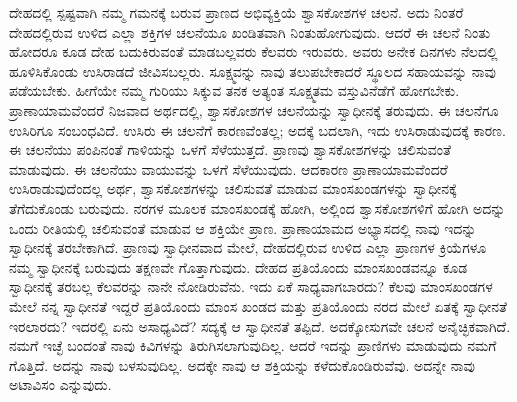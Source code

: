 ದೇಹದಲ್ಲಿ ಸ್ಪಷ್ಟವಾಗಿ ನಮ್ಮ ಗಮನಕ್ಕೆ ಬರುವ ಪ್ರಾಣದ ಅಭಿವ್ಯಕ್ತಿಯೆ ಶ್ವಾಸಕೋಶಗಳ ಚಲನೆ. ಅದು ನಿಂತರೆ ದೇಹದಲ್ಲಿರುವ ಉಳಿದ ಎಲ್ಲಾ ಶಕ್ತಿಗಳ ಚಲನೆಯೂ ಖಂಡಿತವಾಗಿ ನಿಂತುಹೋಗುವುದು. ಆದರೆ ಈ ಚಲನೆ ನಿಂತು ಹೋದರೂ ಕೂಡ ದೇಹ ಬದುಕಿರುವಂತೆ ಮಾಡಬಲ್ಲವರು ಕೆಲವರು ಇರುವರು. ಅವರು ಅನೇಕ ದಿನಗಳು ನೆಲದಲ್ಲಿ ಹೂಳಿಸಿಕೊಂಡು ಉಸಿರಾಡದೆ ಜೀವಿಸಬಲ್ಲರು. ಸೂಕ್ಷ್ಮವನ್ನು ನಾವು ತಲುಪಬೇಕಾದರೆ ಸ್ಥೂಲದ ಸಹಾಯವನ್ನು ನಾವು ಪಡೆಯಬೇಕು. ಹೀಗೆಯೇ ನಮ್ಮ ಗುರಿಯು ಸಿಕ್ಕುವ ತನಕ ಅತ್ಯಂತ ಸೂಕ್ಷ್ಮತಮ ವಸ್ತುವಿನೆಡೆಗೆ ಹೋಗಬೇಕು. ಪ್ರಾಣಾಯಾಮವೆಂದರೆ ನಿಜವಾದ ಅರ್ಥದಲ್ಲಿ, ಶ್ವಾಸಕೋಶಗಳ ಚಲನೆಯನ್ನು ಸ್ವಾಧೀನಕ್ಕೆ ತರುವುದು. ಈ ಚಲನೆಗೂ ಉಸಿರಿಗೂ ಸಂಬಂಧವಿದೆ. ಉಸಿರು ಈ ಚಲನೆಗೆ ಕಾರಣವೆಂತಲ್ಲ; ಅದಕ್ಕೆ ಬದಲಾಗಿ, ಇದು ಉಸಿರಾಡುವುದಕ್ಕೆ ಕಾರಣ. ಈ ಚಲನೆಯು ಪಂಪಿನಂತೆ ಗಾಳಿಯನ್ನು ಒಳಗೆ ಸೆಳೆಯುತ್ತದೆ. ಪ್ರಾಣವು ಶ್ವಾಸಕೋಶಗಳನ್ನು ಚಲಿಸುವಂತೆ ಮಾಡುವುದು. ಈ ಚಲನೆಯು ವಾಯುವನ್ನು ಒಳಗೆ ಸೆಳೆಯುವುದು. ಆದಕಾರಣ ಪ್ರಾಣಾಯಾಮವೆಂದರೆ ಉಸಿರಾಡುವುದೆಂದಲ್ಲ ಅರ್ಥ, ಶ್ವಾಸಕೋಶಗಳನ್ನು ಚಲಿಸುವತೆ ಮಾಡುವ ಮಾಂಸಖಂಡಗಳನ್ನು ಸ್ವಾಧೀನಕ್ಕೆ ತೆಗೆದುಕೊಂಡು ಬರುವುದು. ನರಗಳ ಮೂಲಕ ಮಾಂಸಖಂಡಕ್ಕೆ ಹೋಗಿ, ಅಲ್ಲಿಂದ ಶ್ವಾಸಕೋಶಗಳಿಗೆ ಹೋಗಿ ಅದನ್ನು ಒಂದು ರೀತಿಯಲ್ಲಿ ಚಲಿಸುವಂತೆ ಮಾಡುವ ಆ ಶಕ್ತಿಯೇ ಪ್ರಾಣ. ಪ್ರಾಣಾಯಾಮದ ಅಭ್ಯಾಸದಲ್ಲಿ ನಾವು ಇದನ್ನು ಸ್ವಾಧೀನಕ್ಕೆ ತರಬೇಕಾಗಿದೆ. ಪ್ರಾಣವು ಸ್ವಾಧೀನವಾದ ಮೇಲೆ, ದೇಹದಲ್ಲಿರುವ ಉಳಿದ ಎಲ್ಲಾ ಪ್ರಾಣಗಳ ಕ್ರಿಯೆಗಳೂ ನಮ್ಮ ಸ್ವಾಧೀನಕ್ಕೆ ಬರುವುದು ತಕ್ಷಣವೇ ಗೊತ್ತಾಗುವುದು. ದೇಹದ ಪ್ರತಿಯೊಂದು ಮಾಂಸಖಂಡವನ್ನೂ ಕೂಡ ಸ್ವಾಧೀನಕ್ಕೆ ತರಬಲ್ಲ ಕೆಲವರನ್ನು ನಾನೇ ನೋಡಿರುವೆನು. ಇದು ಏಕೆ ಸಾಧ್ಯವಾಗಬಾರದು? ಕೆಲವು ಮಾಂಸಖಂಡಗಳ ಮೇಲೆ ನನ್ನ ಸ್ವಾಧೀನತೆ ಇದ್ದರೆ ಪ್ರತಿಯೊಂದು ಮಾಂಸ ಖಂಡದ ಮತ್ತು ಪ್ರತಿಯೊಂದು ನರದ ಮೇಲೆ ಏತಕ್ಕೆ ಸ್ವಾಧೀನತೆ ಇರಲಾರದು? ಇದರಲ್ಲಿ ಏನು ಅಸಾಧ್ಯವಿದೆ? ಸದ್ಯಕ್ಕೆ ಆ ಸ್ವಾಧೀನತೆ ತಪ್ಪಿದೆ. ಅದಕ್ಕೋಸುಗವೇ ಚಲನೆ ಅನೈಚ್ಛಿಕವಾಗಿದೆ. ನಮಗೆ ಇಚ್ಛೆ ಬಂದಂತೆ ನಾವು ಕಿವಿಗಳನ್ನು ತಿರುಗಿಸಲಾಗುವುದಿಲ್ಲ. ಆದರೆ ಇದನ್ನು ಪ್ರಾಣಿಗಳು ಮಾಡುವುದು ನಮಗೆ ಗೊತ್ತಿದೆ. ಅದನ್ನು ನಾವು ಬಳಸುವುದಿಲ್ಲ. ಅದಕ್ಕೇ ನಾವು ಆ ಶಕ್ತಿಯನ್ನು ಕಳೆದುಕೊಂಡಿರುವೆವು. ಅದನ್ನೇ ನಾವು ಅಟಾವಿಸಂ  ಎನ್ನುವುದು. 

